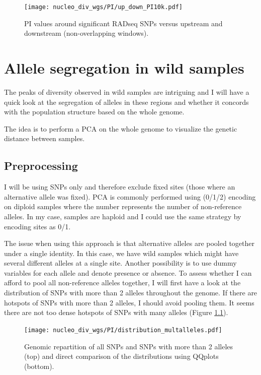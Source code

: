 \documentclass[10pt,a4paper]{report}
\begin{document}
\begin{figure}
\texttt{[image: nucleo\_div\_wgs/PI/up\_down\_PI10k.pdf]}
\caption{PI values around significant RADseq SNPs versus upstream and downstream (non-overlapping windows).}
\label{local_PI_RAD}
\end{figure}

\chapter{Allele segregation in wild samples}
The peaks of diversity observed in wild samples are intriguing and I will have a quick look at the segregation of alleles in these regions and whether it concords with the population structure based on the whole genome. 

The idea is to perform a PCA on the whole genome to visualize the genetic distance between samples.

\section{Preprocessing}
I will be using SNPs only and therefore exclude fixed sites (those where an alternative allele was fixed). PCA is commonly performed using (0/1/2) encoding on diploid samples where the number represents the number of non-reference alleles. In my case, samples are haploid and I could use the same strategy by encoding sites as 0/1. 

The issue when using this approach is that alternative alleles are pooled together under a single identity. In this case, we have wild samples which might have several different alleles at a single site. Another possibility is to use dummy variables for each allele and denote presence or absence. To assess whether I can afford to pool all non-reference alleles together, I will first have a look at the distribution of SNPs with more than 2 alleles throughout the genome. If there are hotspots of SNPs with more than 2 alleles, I should avoid pooling them. It seems there are not too dense hotspots of SNPs with many alleles (Figure \ref{dist_multalleles}).

\begin{figure}
\texttt{[image: nucleo\_div\_wgs/PI/distribution\_multalleles.pdf]}
\caption{Genomic repartition of all SNPs and SNPs with more than 2 alleles (top) and direct comparison of the distributions using QQplots (bottom).}
\label{dist_multalleles}
\end{figure}
\end{document}
